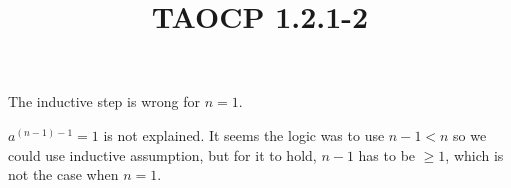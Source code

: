 \documentclass{article}
\title{TAOCP 1.2.1\mbox{-}2}
\begin{document}
\maketitle

The inductive step is wrong for \( n = 1 \).

\( a^{(n-1)-1} = 1 \) is not explained. It seems the logic was to use \( n - 1 < n \) so we could use inductive assumption, but for it to hold, \( n - 1 \) has to be \( \geq 1 \), which is not the case when \( n = 1 \).
\end{document}
